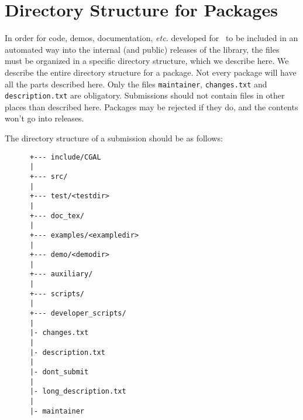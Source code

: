 
\chapter{Directory Structure for Packages}
\label{chap:directory_structure}

In order for code, demos, documentation, {\em etc.} developed for \cgal\ to 
be included in an automated way into the internal (and public) releases of the 
library, the files must be organized in a specific directory structure, which 
we describe here.  We describe the entire directory structure for a package. 
Not every package will have all the parts described here. Only the files
{\tt maintainer}, {\tt changes.txt} and {\tt description.txt} 
are obligatory.
Submissions should not contain files in other places than described here.
Packages may be rejected if they do, and the contents won't go into releases.

The directory structure of a submission should be as follows: 

\begin{verbatim}
      +--- include/CGAL
      |
      +--- src/
      |
      +--- test/<testdir>
      |
      +--- doc_tex/
      |
      +--- examples/<exampledir>
      |
      +--- demo/<demodir>
      |
      +--- auxiliary/
      |
      +--- scripts/
      |
      +--- developer_scripts/
      |
      |- changes.txt
      |
      |- description.txt
      |
      |- dont_submit
      |
      |- long_description.txt
      |
      |- maintainer
\end{verbatim}



